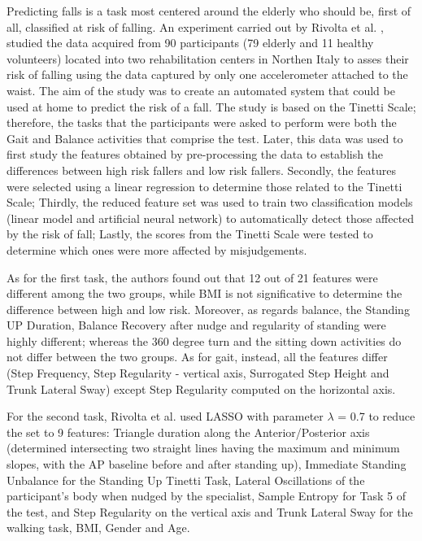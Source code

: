 Predicting falls is a task most centered around the elderly who should be, first of all, classified at risk of falling. An experiment carried out by Rivolta et al. \cite{TinettiScale}, studied the data acquired from 90 participants (79 elderly and 11 healthy volunteers) located into two rehabilitation centers in Northen Italy to asses their risk of falling using the data captured by only one accelerometer attached to the waist. The aim of the study was to create an automated system that could be used at home to predict the risk of a fall.
The study is based on the Tinetti Scale; therefore, the tasks that the participants were asked to perform were both the Gait and Balance activities that comprise the test. Later, this data was used to first study the features obtained by pre-processing the data to establish the differences between high risk fallers and low risk fallers. Secondly, the features were selected using a linear regression to determine those related to the Tinetti Scale; Thirdly, the reduced feature set was used to train two classification models (linear model and artificial neural network) to automatically detect those affected by the risk of fall; Lastly, the scores from the Tinetti Scale were tested to determine which ones were more affected by misjudgements. 

As for the first task, the authors found out that 12 out of 21 features were different among the two groups, while BMI is not significative to determine the difference between high and low risk.
Moreover, as regards balance, the Standing UP Duration, Balance Recovery after nudge and regularity of standing were highly different; whereas the 360 degree turn and the sitting down activities do not differ between the two groups.
As for gait, instead, all the features differ (Step Frequency, Step Regularity - vertical axis, Surrogated Step Height and Trunk Lateral Sway) except Step Regularity computed on the horizontal axis. 

For the second task, Rivolta et al. used LASSO with parameter $\lambda$ = 0.7 to reduce the set to 9 features: Triangle duration along the Anterior/Posterior axis (determined intersecting two straight lines having the maximum and minimum slopes, with the
AP baseline before and after standing up),  Immediate Standing Unbalance for the Standing Up Tinetti Task, Lateral Oscillations of the participant's body when nudged by the specialist, Sample Entropy for Task 5 of the test, and Step Regularity on the vertical axis and Trunk Lateral Sway for the walking task, BMI, Gender and Age.

